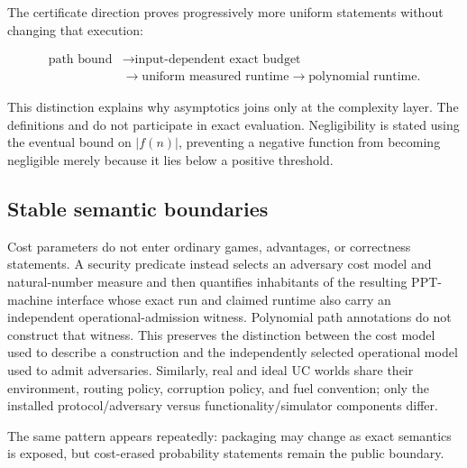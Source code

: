 The certificate direction proves progressively more uniform statements without
changing that execution:

\[
  \begin{aligned}
    \text{path bound}&\longrightarrow\text{input-dependent exact budget}
    \\
    &\longrightarrow\text{uniform measured runtime}
      \longrightarrow\text{polynomial runtime}.
  \end{aligned}
\]

This distinction explains why asymptotics joins only at the complexity layer.
The definitions  and  do not participate
in exact evaluation.  Negligibility is stated using the eventual bound on
\(\lvert f(n)\rvert\), preventing a negative function from becoming negligible
merely because it lies below a positive threshold.

\subsection{Stable semantic boundaries}

Cost parameters do not enter ordinary games, advantages, or correctness
statements.  A security predicate instead selects an adversary cost model and
natural-number measure and then quantifies inhabitants of the resulting
PPT-machine interface whose exact run and claimed runtime also carry an
independent operational-admission witness.  Polynomial path annotations do not
construct that witness.  This preserves the distinction between the cost model
used to describe a construction and the independently selected operational
model used to admit adversaries.  Similarly, real and ideal UC worlds share
their environment, routing policy, corruption policy, and fuel convention;
only the installed protocol/adversary versus functionality/simulator components
differ.

The same pattern appears repeatedly: packaging may change as exact semantics
is exposed, but cost-erased probability statements remain the public boundary.
